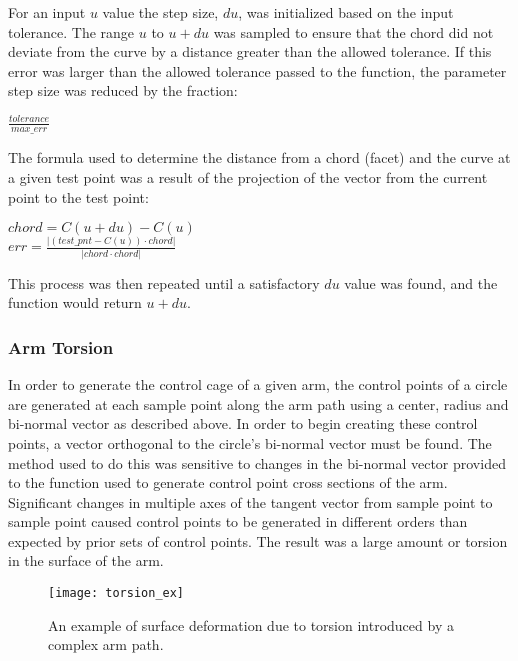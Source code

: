 \documentclass[twocolumn]{article}
\begin{document}
For an input $u$ value the step size, $du$, was initialized based on the input tolerance. The range $u$ to $u+du$ was sampled to ensure that the chord did not deviate from the curve by a distance greater than the allowed tolerance. If this error was larger than the allowed tolerance passed to the function, the parameter step size was reduced by the fraction:

\begin{center}
$ \frac{tolerance}{max\_err} $
\end{center}

The formula used to determine the distance from a chord (facet) and the curve at a given test point was a result of the projection of the vector from the current point to the test point:

\begin{center}
{$chord =  C(u+du)-C(u)$}\\
{$err = \frac{|(test\_pnt-C(u)) \cdot chord|}{|chord \cdot chord|}$}
\end{center}

This process was then repeated until a satisfactory $du$ value was found, and the function would return $u+du$.

\subsubsection{Arm Torsion}

In order to generate the control cage of a given arm, the control points of a circle are generated at each sample point along the arm path using a center, radius and bi-normal vector as described above. In order to begin creating these control points, a vector orthogonal to the circle's bi-normal vector must be found. The method used to do this was sensitive to changes in the bi-normal vector provided to the function used to generate control point cross sections of the arm. Significant changes in multiple axes of the tangent vector from sample point to sample point caused control points to be generated in different orders than expected by prior sets of control points. The result was a large amount or torsion in the surface of the arm. 

\begin{figure}[h!]
\begin{center}
\texttt{[image: torsion\_ex]}
\caption{An example of surface deformation due to torsion introduced by a complex arm path.}
\end{center}
\end{figure}
\end{document}
